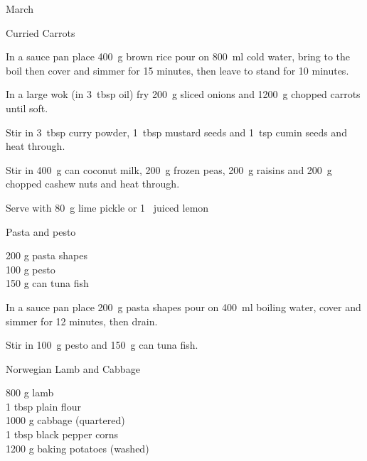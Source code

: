 \begin{menu}{March}
\begin{recipe}{2}{Curried Carrots}
    \begin{instructions}
    \item 
      In a
      sauce pan
      place
      400~g  brown rice
      pour on
      800~ml  cold water,
      bring to the boil then cover and simmer for 15 minutes,
      then leave to stand for 10 minutes.
    \item 
        In a large wok
        (in 3~tbsp  oil)
        fry
        200~g sliced onions
        and
        1200~g chopped carrots
        until soft.
      \item 
        Stir in
        3~tbsp  curry powder,
        1~tbsp  mustard seeds
        and
        1~tsp  cumin seeds
        and heat through.
      \item 
        Stir in        
        400~g  can coconut milk,
        200~g  frozen peas,
        200~g  raisins
        and
        200~g chopped cashew nuts
        and heat through.
      \item 
        Serve with 80~g  lime pickle
        or
        1~ juiced lemon
    \end{instructions}
    \end{recipe}%
  
    \begin{recipe}{1}{Pasta and pesto}%
		\begin{ingredients}
		200 g pasta shapes  \\
	100 g pesto  \\
	150 g can tuna fish  \\
	
		\end{ingredients}
	
    \begin{instructions}
    \item 
      In a
      sauce pan
      place
      200~g  pasta shapes
      pour on
      400~ml  boiling water,
      cover and simmer for 12 minutes, then drain.
    \item 
        Stir in
        100~g  pesto and
        150~g  can tuna fish.
      
    \end{instructions}
    \end{recipe}%
  
    \begin{recipe}{2}{Norwegian Lamb and Cabbage}%
		\begin{ingredients}
		800 g lamb  \\
	1 tbsp plain flour  \\
	1000 g cabbage (quartered) \\
	1 tbsp black pepper corns  \\
	1200 g baking potatoes (washed) \\
	

\end{ingredients}
\end{recipe}
\end{menu}

